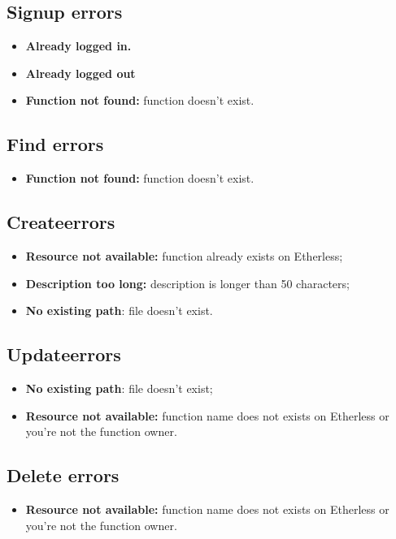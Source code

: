 \subsection{Signup errors}
\begin{itemize}
	\item \textbf{Already logged in.}
\end{itemize}
\begin{itemize}
	\item \textbf{Already logged out}
\end{itemize}
\begin{itemize}
	\item \textbf{Function not found:} function doesn't exist.
\end{itemize}
\subsection{Find errors}
\begin{itemize}
	\item \textbf{Function not found:} function doesn't exist.
\end{itemize}
\subsection{Create\glo errors}
\begin{itemize}
	\item \textbf{Resource not available:} function already exists on Etherless;
	\item \textbf{Description too long:} description is longer than 50 characters;
	\item \textbf{No existing path}: file doesn't exist.
\end{itemize}
\subsection{Update\glo errors}
\begin{itemize}
	\item \textbf{No existing path}: file doesn't exist;
	\item \textbf{Resource not available:} function name does not exists on Etherless or you're not the function owner.
\end{itemize}
\subsection{Delete errors}
\begin{itemize}
 	\item \textbf{Resource not available:} function name does not exists on Etherless or you're not the function owner.
\end{itemize}
